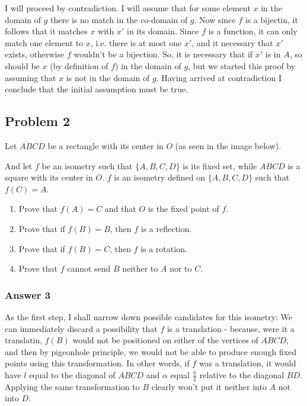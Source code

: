 \documentclass[11pt]{article}
\begin{document}
I will proceed by contradiction.  I will assume that for some element $x$
in the domain of $g$ there is no match in the co-domain of $g$.  Now
since $f$ is a bijectin, it follows that it matches $x$ with $x'$ in its
domain.  Since $f$ is a function, it can only match one element to $x$,
i.e. there is at most one $x'$, and it necessary that $x'$ exists,
otherwise $f$ wouldn't be a bijection.  So, it is necessary that if $x'$
is in $A$, so should be $x$ (by definition of $f$) in the domain of $g$,
but we started this proof by assuming that $x$ is not in the domain of
$g$.  Having arrived at contradiction I conclude that the initial
assumption must be true.
\subsection{Problem 2}
\label{sec-1-2}
Let $ABCD$ be a rectangle with its center in $O$ (as seen in the image below).


And let $f$ be an isometry such that $\{A,B,C,D\}$ is its fixed set, while
$ABCD$ is a square with its center in $O$.  $f$ is an isometry defined
on $\{A,B,C,D\}$ such that $f(C)=A$.

\begin{enumerate}
\item Prove that $f(A)=C$ and that $O$ is the fixed point of $f$.
\item Prove that if $f(B)=B$, then $f$ is a reflection.
\item Prove that if $f(B)=C$, then $f$ is a rotation.
\item Prove that $f$ cannot send $B$ neither to $A$ nor to $C$.
\end{enumerate}

\subsubsection{Answer 3}
\label{sec-1-2-1}
As the first step, I shall narrow down possible candidates for this isometry:
We can immediately discard a possibility that $f$ is a translation - because,
were it a translatin, $f(B)$ would not be positioned on either of the vertices
of $ABCD$, and then by pigeonhole principle, we would not be able to produce
enough fixed points using this transformation.  In other words, if $f$ was a
translation, it would have $l$ equal to the diagonal of $ABCD$ and $\alpha$
equal $\frac{\pi}{2}$ relative to the diagonal $BD$.  Applying the same
transformation to $B$ clearly won't put it neither into $A$ not into $D$.
\end{document}
